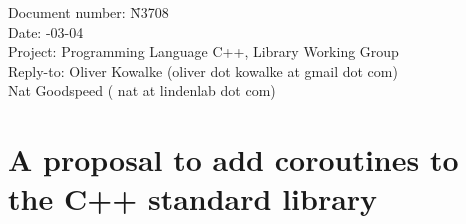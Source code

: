 \documentclass[a4paper,10pt,DIV15]{scrartcl}
\begin{document}
\small
\begin{tabbing}
    Document number: \= N3708 \\
    Date:            -03-04 \\
    Project:         \> Programming Language C++, Library Working Group \\
    Reply-to:        \> Oliver Kowalke (oliver dot kowalke at gmail dot com)\\
                     \> Nat Goodspeed ( nat at lindenlab dot com)\\
\end{tabbing}

\section*{A proposal to add coroutines to the C++ standard library}


\tableofcontents














\end{document}
